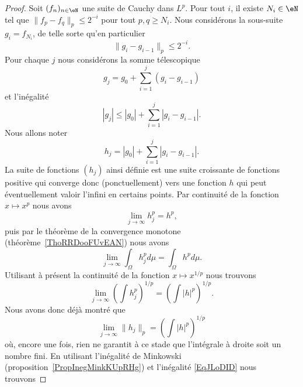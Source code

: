 \begin{proof}
    Soit \( (f_n)_{n\in\eN}\) une suite de Cauchy dans \( L^p\). Pour tout \( i\), il existe \( N_i\in\eN\) tel que $\| f_p-f_q \|_p\leq 2^{-i}$ pour tout \( p,q\geq N_i\). Nous considérons la sous-suite \( g_i=f_{N_i}\), de telle sorte qu'en particulier
    \begin{equation}    \label{EqJLoDID}
        \|g_i-g_{i-1}\|_p\leq 2^{-i}.
    \end{equation}
    Pour chaque \( j\) nous considérons la somme télescopique
    \begin{equation}
        g_j=g_0+\sum_{i=1}^j(g_i-g_{i-1})
    \end{equation}
    et l'inégalité
    \begin{equation}
        | g_j |\leq | g_0 |+\sum_{i=1}^j| g_i-g_{i-1} |.
    \end{equation}
    Nous allons noter
    \begin{equation}        \label{EqSomPaFPQOWC}
        h_j=| g_0 |+\sum_{i=1}^j| g_i-g_{i-1} |.
    \end{equation}
    La suite de fonctions \( (h_j)\) ainsi définie est une suite croissante de fonctions positive qui converge donc (ponctuellement) vers une fonction \( h\) qui peut éventuellement valoir l'infini en certains points. Par continuité de la fonction \( x\mapsto x^p\) nous avons
    \begin{equation}
        \lim_{j\to \infty} h_j^p=h^p,
    \end{equation}
    puis par le théorème de la convergence monotone (théorème~\ref{ThoRRDooFUvEAN}) nous avons
    \begin{equation}
        \lim_{j\to \infty} \int_{\Omega}h_j^pd\mu=\int_{\Omega}h^pd\mu.
    \end{equation}
    Utilisant à présent la continuité de la fonction \( x\mapsto x^{1/p}\) nous trouvons
    \begin{equation}
        \lim_{j\to \infty} \left( \int h_j^p \right)^{1/p}=\left( \int | h |^p \right)^{1/p}.
    \end{equation}
    Nous avons donc déjà montré que
    \begin{equation}
        \lim_{j\to \infty} \| h_j \|_p=\left( \int | h |^p \right)^{1/p}
    \end{equation}
    où, encore une fois, rien ne garantit à ce stade que l'intégrale à droite soit un nombre fini. En utilisant l'inégalité de Minkowski (proposition~\ref{PropInegMinkKUpRHg}) et l'inégalité \eqref{EqJLoDID} nous trouvons

\end{proof}
